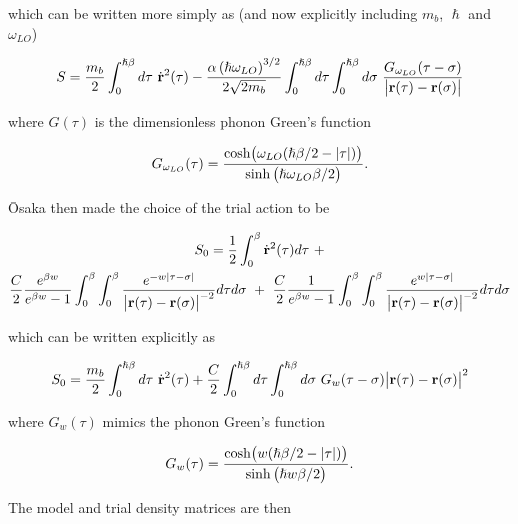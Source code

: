 which can be written more simply as (and now explicitly including $m_b$, $\hslash$ and $\omega_{LO}$)

\begin{equation}\label{eqn:thermal_action}
    S = \frac{m_b}{2} \int_0^{\hslash\beta} d\tau\ \dot{\vb{r}}^2(\tau) - \frac{\alpha \left(\hslash \omega_{LO}\right)^{3/2}}{2\sqrt{2 m_b}} \int_0^{\hslash\beta} d\tau \int_0^{\hslash\beta} d\sigma\ \frac{G_{\omega_{LO}}(\tau - \sigma)}{\abs{\vb{r}(\tau) - \vb{r}(\sigma)}}
\end{equation}

where $G(\tau)$ is the dimensionless phonon Green's function

\begin{equation}
    G_{\omega_{LO}}(\tau) = \frac{\cosh(\omega_{LO} (\hslash\beta/2 - \abs{\tau}))}{\sinh\left(\hslash\omega_{LO}\beta/2\right)}.
\end{equation}

\=Osaka then made the choice of the trial action to be

\begin{equation}
    \begin{gathered}
    S_0 = \frac{1}{2} \int_0^\beta \dot{\vb{r}}^2(\tau) d\tau\ +\\ \frac{C}{2}\frac{e^{\beta w}}{e^{\beta w} - 1} \int_0^\beta \int_0^\beta \frac{e^{-w|\tau-\sigma|}}{\left| \vb{r}(\tau) - \vb{r}(\sigma) \right|^{-2}} d\tau d\sigma \ +\ \frac{C}{2}\frac{1}{e^{\beta w} - 1} \int_0^\beta \int_0^\beta \frac{e^{w|\tau-\sigma|}}{\left| \vb{r}(\tau) - \vb{r}(\sigma) \right|^{-2}} d\tau d\sigma
    \end{gathered}
\end{equation}

which can be written explicitly as

\begin{equation}\label{eqn:thermal_trial_action}
    S_0 = \frac{m_b}{2} \int_0^{\hslash\beta} d\tau\ \dot{\vb{r}}^2(\tau) + \frac{C}{2} \int_0^{\hslash\beta} d\tau \int_0^{\hslash\beta} d\sigma\ G_w(\tau - \sigma) \abs{\vb{r}(\tau) - \vb{r}(\sigma)}^2
\end{equation}

where $G_w(\tau)$ mimics the phonon Green's function

\begin{equation}
    G_{w}(\tau) = \frac{\cosh(w (\hslash\beta/2 - \abs{\tau}))}{\sinh\left(\hslash w \beta/2\right)}.
\end{equation}

The model and trial density matrices are then

